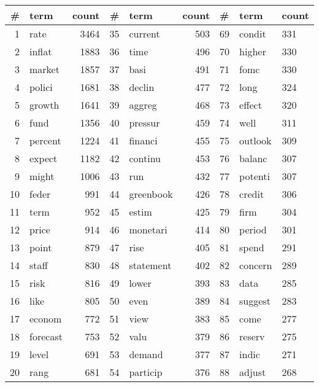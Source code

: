 \begin{tabular}{rlrrlrlll}
\toprule
  \# &      term & count &   \# &       term & count &    \# &     term & count \\
\midrule
  1 &      rate &  3464 &  35 &    current &   503 &   69 &   condit &   331 \\
  2 &    inflat &  1883 &  36 &       time &   496 &   70 &   higher &   330 \\
  3 &    market &  1857 &  37 &       basi &   491 &   71 &     fomc &   330 \\
  4 &    polici &  1681 &  38 &     declin &   477 &   72 &     long &   324 \\
  5 &    growth &  1641 &  39 &     aggreg &   468 &   73 &   effect &   320 \\
  6 &      fund &  1356 &  40 &    pressur &   459 &   74 &     well &   311 \\
  7 &   percent &  1224 &  41 &    financi &   455 &   75 &  outlook &   309 \\
  8 &    expect &  1182 &  42 &    continu &   453 &   76 &   balanc &   307 \\
  9 &     might &  1006 &  43 &        run &   432 &   77 &  potenti &   307 \\
 10 &     feder &   991 &  44 &  greenbook &   426 &   78 &   credit &   306 \\
 11 &      term &   952 &  45 &      estim &   425 &   79 &     firm &   304 \\
 12 &     price &   914 &  46 &   monetari &   414 &   80 &   period &   301 \\
 13 &     point &   879 &  47 &       rise &   405 &   81 &    spend &   291 \\
 14 &     staff &   830 &  48 &  statement &   402 &   82 &  concern &   289 \\
 15 &      risk &   816 &  49 &      lower &   393 &   83 &     data &   285 \\
 16 &      like &   805 &  50 &       even &   389 &   84 &  suggest &   283 \\
 17 &    econom &   772 &  51 &       view &   383 &   85 &     come &   277 \\
 18 &  forecast &   753 &  52 &       valu &   379 &   86 &   reserv &   275 \\
 19 &     level &   691 &  53 &     demand &   377 &   87 &    indic &   271 \\
 20 &      rang &   681 &  54 &   particip &   376 &   88 &   adjust &   268 \\

\end{tabular}
